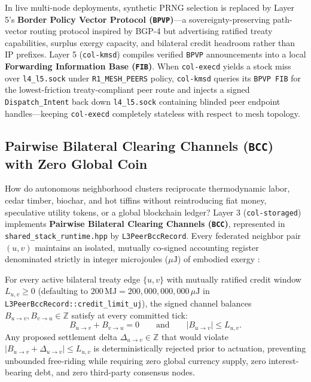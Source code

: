 In live multi-node deployments, synthetic PRNG selection is replaced by Layer 5's
\textbf{Border Policy Vector Protocol (\texttt{BPVP})}---a sovereignty-preserving path-vector
routing protocol inspired by BGP-4 \parencite{rekhter2006} but advertising ratified treaty
capabilities, surplus exergy capacity, and bilateral credit headroom rather than IP prefixes.
Layer 5 (\texttt{col-kmsd}) compiles verified \texttt{BPVP} announcements into a local
\textbf{Forwarding Information Base (\texttt{FIB})}. When \texttt{col-execd} yields a stock
miss over \texttt{l4\_l5.sock} under \texttt{R1\_MESH\_PEERS} policy, \texttt{col-kmsd} queries
its \texttt{BPVP FIB} for the lowest-friction treaty-compliant peer route and injects a signed
\texttt{Dispatch\_Intent} back down \texttt{l4\_l5.sock} containing blinded peer endpoint
handles---keeping \texttt{col-execd} completely stateless with respect to mesh topology.

\subsection{Pairwise Bilateral Clearing Channels (\texttt{BCC}) with Zero Global Coin}

How do autonomous neighborhood clusters reciprocate thermodynamic labor, cedar timber, biochar,
and hot tiffins without reintroducing fiat money, speculative utility tokens, or a global
blockchain ledger? Layer 3 (\texttt{col-storaged}) implements \textbf{Pairwise Bilateral
Clearing Channels (\texttt{BCC})}, represented in \texttt{shared\_stack\_runtime.hpp} by
\texttt{L3PeerBccRecord}. Every federated neighbor pair $(u, v)$ maintains an isolated,
mutually co-signed accounting register denominated strictly in integer microjoules ($\mu\mathrm{J}$)
of embodied exergy \parencite{odum1971,ostrom1990}:

\begin{invariant}
\label{inv:bcc-zero-sum}
For every active bilateral treaty edge $\{u, v\}$ with mutually ratified credit window
$L_{u,v} \ge 0$ (defaulting to $200\,\mathrm{MJ} = 200{,}000{,}000{,}000\,\mu\mathrm{J}$ in
\texttt{L3PeerBccRecord::credit\_limit\_uj}), the signed channel balances
$B_{u \to v}, B_{v \to u} \in \mathbb{Z}$ satisfy at every committed tick:
\begin{equation}
\label{eq:bcc-invariants}
B_{u \to v} + B_{v \to u} = 0 \qquad \text{and} \qquad |B_{u \to v}| \le L_{u,v}.
\end{equation}
Any proposed settlement delta $\Delta_{u \to v} \in \mathbb{Z}$ that would violate
$|B_{u \to v} + \Delta_{u \to v}| \le L_{u,v}$ is deterministically rejected prior to actuation,
preventing unbounded free-riding while requiring zero global currency supply, zero
interest-bearing debt, and zero third-party consensus nodes.
\end{invariant}

